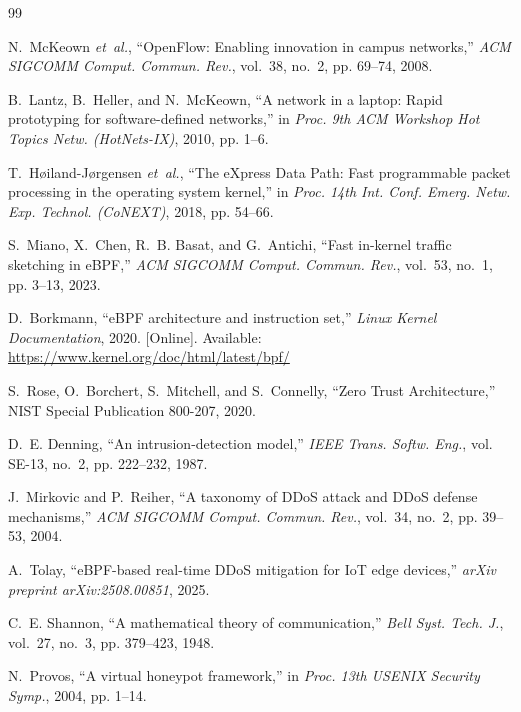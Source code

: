 \documentclass[conference]{IEEEtran}
\begin{document}

\begin{thebibliography}{99}

N.~McKeown \emph{et~al.}, ``OpenFlow: Enabling innovation in campus networks,'' \emph{ACM SIGCOMM Comput. Commun. Rev.}, vol.~38, no.~2, pp. 69--74, 2008.

B.~Lantz, B.~Heller, and N.~McKeown, ``A network in a laptop: Rapid prototyping for software-defined networks,'' in \emph{Proc. 9th ACM Workshop Hot Topics Netw. (HotNets-IX)}, 2010, pp. 1--6.

T.~H{\o}iland-J{\o}rgensen \emph{et~al.}, ``The eXpress Data Path: Fast programmable packet processing in the operating system kernel,'' in \emph{Proc. 14th Int. Conf. Emerg. Netw. Exp. Technol. (CoNEXT)}, 2018, pp. 54--66.

S.~Miano, X.~Chen, R.~B. Basat, and G.~Antichi, ``Fast in-kernel traffic sketching in eBPF,'' \emph{ACM SIGCOMM Comput. Commun. Rev.}, vol.~53, no.~1, pp. 3--13, 2023.

D.~Borkmann, ``eBPF architecture and instruction set,'' \emph{Linux Kernel Documentation}, 2020. [Online]. Available: \url{https://www.kernel.org/doc/html/latest/bpf/}

S.~Rose, O.~Borchert, S.~Mitchell, and S.~Connelly, ``Zero Trust Architecture,'' NIST Special Publication 800-207, 2020.

D.~E. Denning, ``An intrusion-detection model,'' \emph{IEEE Trans. Softw. Eng.}, vol. SE-13, no.~2, pp. 222--232, 1987.

J.~Mirkovic and P.~Reiher, ``A taxonomy of DDoS attack and DDoS defense mechanisms,'' \emph{ACM SIGCOMM Comput. Commun. Rev.}, vol.~34, no.~2, pp. 39--53, 2004.

A.~Tolay, ``eBPF-based real-time DDoS mitigation for IoT edge devices,'' \emph{arXiv preprint arXiv:2508.00851}, 2025.

C.~E. Shannon, ``A mathematical theory of communication,'' \emph{Bell Syst. Tech. J.}, vol.~27, no.~3, pp. 379--423, 1948.

N.~Provos, ``A virtual honeypot framework,'' in \emph{Proc. 13th USENIX Security Symp.}, 2004, pp. 1--14.


\end{thebibliography}
\end{document}
